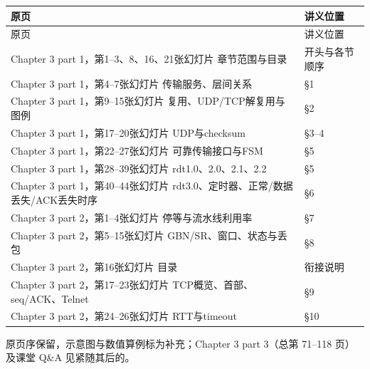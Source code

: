 

\begingroup
\small\setlength{\tabcolsep}{3pt}
\renewcommand{\arraystretch}{1.22}
\begin{longtable}{@{}>{\raggedright\arraybackslash}p{}>{\raggedright\arraybackslash}p{}@{}}
\toprule
原页 & 讲义位置 \\
\midrule\endfirsthead
原页 & 讲义位置 \\
\midrule\endhead
\bottomrule\endfoot
Chapter 3 part 1，第1–3、8、16、21张幻灯片 章节范围与目录 & 开头与各节顺序 \\
Chapter 3 part 1，第4–7张幻灯片 传输服务、层间关系 & §1 \\
Chapter 3 part 1，第9–15张幻灯片 复用、UDP/TCP解复用与图例 & §2 \\
Chapter 3 part 1，第17–20张幻灯片 UDP与checksum & §3–4 \\
Chapter 3 part 1，第22–27张幻灯片 可靠传输接口与FSM & §5 \\
Chapter 3 part 1，第28–39张幻灯片 rdt1.0、2.0、2.1、2.2 & §5 \\
Chapter 3 part 1，第40–44张幻灯片 rdt3.0、定时器、正常/数据丢失/ACK丢失时序 & §6 \\
Chapter 3 part 2，第1–4张幻灯片 停等与流水线利用率 & §7 \\
Chapter 3 part 2，第5–15张幻灯片 GBN/SR、窗口、状态与丢包 & §8 \\
Chapter 3 part 2，第16张幻灯片 目录 & 衔接说明 \\
Chapter 3 part 2，第17–23张幻灯片 TCP概览、首部、seq/ACK、Telnet & §9 \\
Chapter 3 part 2，第24–26张幻灯片 RTT与timeout & §10 \\
\end{longtable}
\endgroup


原页序保留，示意图与数值算例标为补充；Chapter 3 part 3（总第 71–118 页）及课堂 Q\&A 见紧随其后的。
